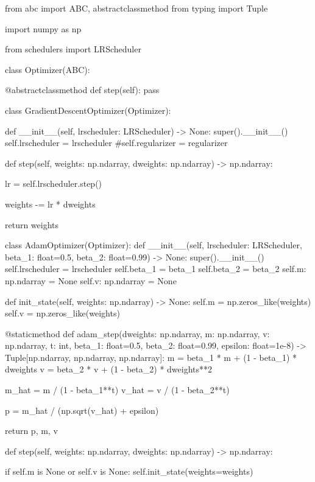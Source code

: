 \documentclass[14pt, a4paper]{article}
\theoremstyle{sltheorem}
\theoremstyle{soltheorem}
\begin{document}
\begin{python}
from abc import ABC, abstractclassmethod
from typing import Tuple

import numpy as np

from schedulers import LRScheduler


class Optimizer(ABC):
    
    @abstractclassmethod
    def step(self):
        pass
    
    

class GradientDescentOptimizer(Optimizer):
    
    def __init__(self, lrscheduler: LRScheduler) -> None:
        super().__init__()
        self.lrscheduler = lrscheduler
        #self.regularizer = regularizer
        
        
    def step(self, weights: np.ndarray, dweights: np.ndarray) -> np.ndarray:
        
        lr = self.lrscheduler.step()
        
        weights -= lr * dweights
        
        return weights
    
    
class AdamOptimizer(Optimizer):
    def __init__(self, lrscheduler: LRScheduler, beta_1: float=0.5, beta_2: float=0.99) -> None:
        super().__init__()
        self.lrscheduler = lrscheduler
        self.beta_1 = beta_1
        self.beta_2 = beta_2
        self.m: np.ndarray = None
        self.v: np.ndarray = None
        
    def init_state(self, weights: np.ndarray) -> None:
        self.m = np.zeros_like(weights)
        self.v = np.zeros_like(weights)
    
    
    @staticmethod
    def adam_step(dweights: np.ndarray, m: np.ndarray, v: np.ndarray, t: int, beta_1: float=0.5, beta_2: float=0.99, epsilon: float=1e-8) -> Tuple[np.ndarray, np.ndarray, np.ndarray]:
        m = beta_1 * m + (1 - beta_1) * dweights
        v = beta_2 * v + (1 - beta_2) * dweights**2

        m_hat = m / (1 - beta_1**t)
        v_hat = v / (1 - beta_2**t)

        p = m_hat / (np.sqrt(v_hat) + epsilon)

        return p, m, v
    
    def step(self, weights: np.ndarray, dweights: np.ndarray) -> np.ndarray:
        
        if self.m is None or self.v is None:
            self.init_state(weights=weights)
        

\end{python}
\end{document}
